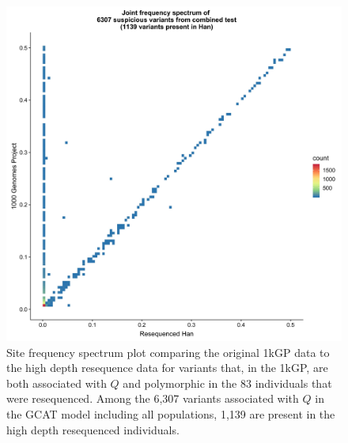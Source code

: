 \documentclass[9pt,lineno]{template}
\begin{document}
\begin{figure}[h]
\centering
\includegraphics[width=12cm,keepaspectratio]{../Figures/Han_1kGP_SFS_FullModel.jpg}
\caption{Site frequency spectrum plot comparing the original 1kGP data to the high depth resequence data for variants that, in the 1kGP, are both associated with $Q$ and polymorphic in the 83 individuals that were resequenced.
Among the 6,307 variants associated with $Q$ in the GCAT model including all populations, 1,139 are present in the high depth resequenced individuals.}  
\label{90HanSFS_30}
\end{figure}
\end{document}

